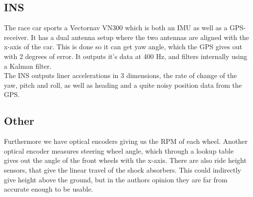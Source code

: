 \subsection{INS}
The race car sports a Vectornav VN300 which is both an IMU as well as a GPS-receiver. It has a dual antenna setup where the two antennas are aligned with the x-axis of the car. This is done so it can get yaw angle, which the GPS gives out with 2 degrees of error. It outputs it's data at 400 Hz, and filters internally using a Kalman filter. \\ 

The INS outputs liner accelerations in 3 dimensions, the rate of change of the yaw, pitch and roll, as well as heading and a quite noisy position data from the GPS. 

\subsection{Other}
Furthermore we have optical encoders giving us the RPM of each wheel. Another optical encoder measures steering wheel angle, which through a lookup table gives out the angle of the front wheels with the x-axis. There are also ride height sensors, that give the linear travel of the shock absorbers. This could indirectly give height above the ground, but in the authors opinion they are far from accurate enough to be usable.